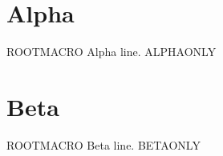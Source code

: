 \documentclass{article}
\newcommand{\RootMacro}{ROOTMACRO}
\begin{document}
\section{Alpha}
\RootMacro
Alpha line.
ALPHAONLY

\section{Beta}
\RootMacro
Beta line.
BETAONLY
\end{document}
